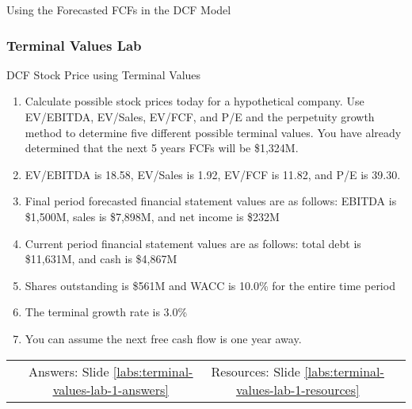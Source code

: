 \documentclass[handout, 11pt]{beamer}
\begin{document}
\begin{section}[Valuation]{Using the Forecasted FCFs in the DCF Model}
\begin{frame}
\end{frame}
\footnotesize
\begin{frame}
\frametitle{Terminal Values Lab}
{
\begin{block}{DCF Stock Price using Terminal Values}
\begin{enumerate}
\item Calculate possible stock prices today for a hypothetical company. Use EV/EBITDA, EV/Sales, EV/FCF, and P/E and the perpetuity growth method to determine five different possible terminal values. You have already determined that the next 5 years FCFs will be \$1,324M. 
\item EV/EBITDA is 18.58, EV/Sales is 1.92, EV/FCF is 11.82, and P/E is 39.30.
\item Final period forecasted financial statement values are as follows: EBITDA is \$1,500M, sales is \$7,898M, and net income is \$232M
\item Current period financial statement values are as follows: total debt is \$11,631M, and cash is \$4,867M
\item Shares outstanding is \$561M and WACC is 10.0\% for the entire time period
\item The terminal growth rate is 3.0\%
\item You can assume the next free cash flow is one year away.
\end{enumerate}
\vfill
\begin{tabular*}{\textwidth}{@{\extracolsep{\fill}}cccc}
\toprule
\hfill & Answers: Slide \textcolor{blue}{\underline{\ref{labs:terminal-values-lab-1-answers}}} & Resources: Slide \textcolor{blue}{\underline{\ref{labs:terminal-values-lab-1-resources}}} & \hfill\\

\end{tabular*}
\end{block}
}
\label{labs:terminal-values-lab-1}
\end{frame}
\normalsize
\end{section}
\appendix
{}
\setcounter{finalframe}{\value{framenumber}}
\end{document}
